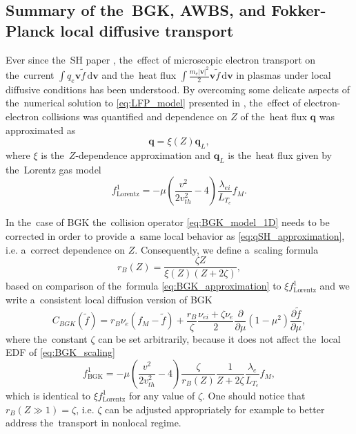\documentclass[
 aps,
 jmp,
 amsmath,amssymb,
 twocolumn,
]{revtex4-1}
\newcommand{\pdv}[2]{\frac{\partial{#1}}{\partial{#2}}}
\newcommand{\vect}[1]{\boldsymbol{#1}}
\newcommand{\dI}{\text{d}}
\newcommand{\mfpe}{\lambda_e}
\newcommand{\mfpei}{\lambda_{ei}}
\newcommand{\Zbar}{Z}
\newcommand{\nue}{\nu_{e}}
\newcommand{\nuei}{\nu_{ei}}
\newcommand{\vmag}{v}
\newcommand{\vth}{v_{th}}
\newcommand{\qe}{q_e}
\newcommand{\me}{m_e}
\newcommand{\fM}{f_M}
\newcommand{\vv}{\vect{v}}
\newcommand{\ft}{f}
\begin{document}
\subsection{Summary of the~BGK, AWBS, and Fokker-Planck local diffusive 
transport}
\label{sec:SummaryDiffusiveKinetics}

Ever since the~SH paper \cite{SpitzerHarm_PR1953}, the~effect of microscopic
electron transport on the~current $\int \qe \vv \tilde{\ft} \, \dI\vv$ 
and the~heat flux $\int \frac{\me |\vv|^2}{2} \vv \tilde{\ft} \, \dI\vv$ 
in plasmas
under local diffusive conditions has been understood. By overcoming some 
delicate aspects of the~numerical solution to \eqref{eq:LFP_model} presented 
in \cite{CSR_1950}, the~effect of electron-electron collisions
was quantified and dependence on $\Zbar$ of the~heat flux
$\vect{q}$ was approximated as \cite{SpitzerHarm_PR1953, Epperlein_PoFB1991} 
\begin{equation}
  \vect{q} = \xi(\Zbar) \vect{q}_L ,
  \label{eq:qSH_approximation}
\end{equation}
where 
$\xi$ is the~$\Zbar$-dependence \cite{Epperlein_PoFB1991} approximation and
$\vect{q}_L$
is the~heat flux given 
by the~Lorentz gas model \cite{Lorentz_1905} 
\begin{equation}
  \ft^1_{\text{Lorentz}} = - \mu 
  \left( \frac{\vmag^2}{2 \vth^2} - 4\right)
  \frac{\mfpei}{L_{T_e}}\fM
  . 
  \label{eq:Lorentz_approximation}
\end{equation}
 
In the~case of BGK the~collision operator \eqref{eq:BGK_model_1D} needs to be 
corrected in order to provide a~same local behavior as 
\eqref{eq:qSH_approximation}, i.e. a~correct dependence on 
$\Zbar$. Consequently, we define a~scaling formula 
\begin{equation}
  r_B(\Zbar) = \frac{\zeta\Zbar}{\xi(\Zbar)(\Zbar + 2 \zeta)} ,
  \label{eq:BGK_r_scaling}
\end{equation}
based on comparison of the~formula \eqref{eq:BGK_approximation} to 
$\xi \ft^1_{\text{Lorentz}}$ and we write a~consistent local diffusion version
of BGK 
\begin{equation}
  C_{BGK}(\tilde{\ft})
  =
  r_B \nue(\fM - \tilde{\ft})
  + \frac{r_B}{\zeta}\frac{\nuei + \zeta\nue}{2}
  \pdv{}{\mu}(1 - \mu^2)\pdv{\tilde{\ft}}{\mu}
   ,
  \label{eq:BGK_scaling}
\end{equation}
where the~constant $\zeta$ can be set arbitrarily, because it does not affect 
the~local EDF of \eqref{eq:BGK_scaling}
\begin{equation}
  \ft^1_{\text{BGK}} = - \mu 
  \left( \frac{\vmag^2}{2 \vth^2} - 4\right)\frac{\zeta}{r_B(\Zbar)}
  \frac{1}{\Zbar + 2\zeta}\frac{\mfpe}{L_{T_e}}\fM
  ,
  \label{eq:f1BGK_approximation}
\end{equation}
which is identical to $\xi \ft^1_{\text{Lorentz}}$ for any value of $\zeta$.
One should notice that $r_B(\Zbar\gg1) = \zeta$, i.e. $\zeta$ can be adjusted 
appropriately for example to better address the~transport in nonlocal regime.
\end{document}
